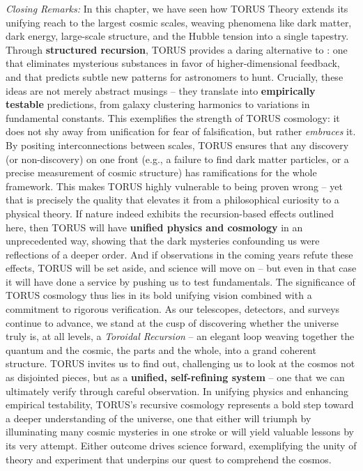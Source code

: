 \documentclass[
]{article}
\begin{document}
{\emph{Closing Remarks:} In this chapter, we have seen how TORUS Theory
extends its unifying reach to the largest cosmic scales, weaving
phenomena like dark matter, dark energy, large-scale structure, and the
Hubble tension into a single tapestry. Through \textbf{structured
recursion}, TORUS provides a daring alternative to \LambdaCDM: one that
eliminates mysterious substances in favor of higher-dimensional
feedback, and that predicts subtle new patterns for astronomers to hunt.
Crucially, these ideas are not merely abstract musings -- they translate
into \textbf{empirically testable} predictions, from galaxy clustering
harmonics to variations in fundamental constants\hspace{0pt}. This
exemplifies the strength of TORUS cosmology: it does not shy away from
unification for fear of falsification, but rather \emph{embraces} it. By
positing interconnections between scales, TORUS ensures that any
discovery (or non-discovery) on one front (e.g., a failure to find dark
matter particles, or a precise measurement of cosmic structure) has
ramifications for the whole framework. This makes TORUS highly
vulnerable to being proven wrong -- yet that is precisely the quality
that elevates it from a philosophical curiosity to a physical theory. If
nature indeed exhibits the recursion-based effects outlined here, then
TORUS will have \textbf{unified physics and cosmology} in an
unprecedented way, showing that the dark mysteries confounding us were
reflections of a deeper order. And if observations in the coming years
refute these effects, TORUS will be set aside, and science will move on
-- but even in that case it will have done a service by pushing us to
test fundamentals. The significance of TORUS cosmology thus lies in its
bold unifying vision combined with a commitment to rigorous
verification. As our telescopes, detectors, and surveys continue to
advance, we stand at the cusp of discovering whether the universe truly
is, at all levels, a \emph{Toroidal Recursion} -- an elegant loop
weaving together the quantum and the cosmic, the parts and the whole,
into a grand coherent structure. TORUS invites us to find out,
challenging us to look at the cosmos not as disjointed pieces, but as a
\textbf{unified, self-refining system} -- one that we can ultimately
verify through careful observation\hspace{0pt}. In unifying physics and
enhancing empirical testability, TORUS's recursive cosmology represents
a bold step toward a deeper understanding of the universe, one that
either will triumph by illuminating many cosmic mysteries in one stroke
or will yield valuable lessons by its very attempt\hspace{0pt}. Either
outcome drives science forward, exemplifying the unity of theory and
experiment that underpins our quest to comprehend the cosmos.

}
\end{document}
